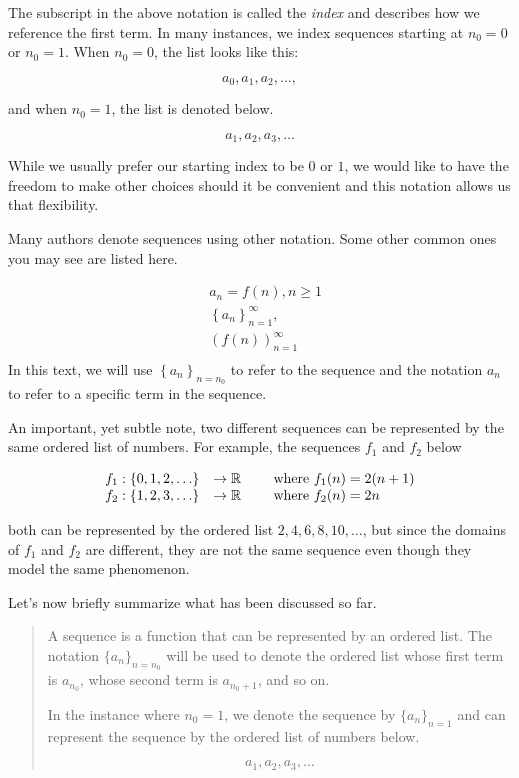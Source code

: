 \documentclass{ximera}
\begin{document}
The subscript in the above notation is called the \emph{index} and describes how we reference the first term.  In many instances, we index sequences starting at $n_0=0$ or $n_0=1$.  When $n_0=0$, the list looks like this:

\[
a_0,a_1,a_2, \ldots ,
\]

and when $n_0=1$, the list is denoted below.

\[
a_1,a_2,a_3, \ldots 
\]


While we usually prefer our starting index to be $0$ or $1$, we would like to have the freedom to make other choices should it be convenient and this notation allows us that flexibility.  

\begin{remark}
Many authors denote sequences using other notation.  Some other common ones you may see are listed here. 

\begin{align*}
  &a_n = f(n), n \geq 1   \\
  & \left\{a_n\right\}_{n=1}^\infty, \\
  & \left(f(n)\right)_{n=1}^\infty \\
\end{align*}
In this text, we will use $\left\{a_n\right\}_{n=n_0}$ to refer to the sequence and the notation $a_n$ to refer to a specific term in the sequence.

\end{remark}


An important, yet subtle note, two different sequences can be represented by the same ordered list of numbers.  For example, the sequences $f_1$ and $f_2$ below

\[ \begin{array}{rl}
f_1 : \{0,1,2,\ldots \} & \to \mathbb R \qquad \textrm{ where } f_1(n) =2(n+1) \\
f_2 : \{1,2,3, \ldots \} & \to \mathbb R \qquad \textrm{ where } f_2(n) =2n \\
\end{array}
\]

both can be represented by the ordered list $2, 4, 6, 8, 10, \ldots$, but since the domains of $f_1$ and $f_2$ are different, they are not the same sequence even though they model the same phenomenon. 

Let's now briefly summarize what has been discussed so far.

\begin{quote}
A sequence is a function that can be represented by an ordered list.  The notation $\{a_n\}_{n=n_0}$ will be used to denote the ordered list whose first term is $a_{n_0}$, whose second term is $a_{n_0+1}$, and so on.  

In the instance where $n_0=1$, we denote the sequence by $\{a_n\}_{n=1}$ and can represent the sequence by the ordered list of numbers below.

\[
a_1, a_2, a_3, \ldots
\]
\end{quote}
\end{document}
